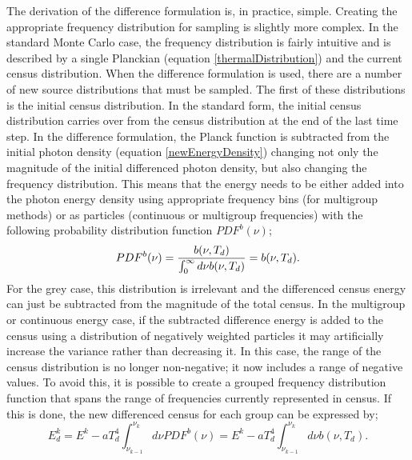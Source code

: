 \noindent
	\indent The derivation of the difference formulation is, in practice, simple. Creating the appropriate frequency distribution for sampling is slightly more complex. In the standard Monte Carlo case, the frequency distribution is fairly intuitive and is described by a single Planckian (equation \ref{thermalDistribution}) and the current census distribution. When the difference formulation is used, there are a number of new source distributions that must be sampled. The first of these distributions is the initial census distribution. In the standard form, the initial census distribution carries over from the census distribution at the end of the last time step. In the difference formulation, the Planck function is subtracted from the initial photon density (equation \ref{newEnergyDensity}) changing not only the magnitude of the initial differenced photon density, but also changing the frequency distribution. This means that the energy needs to be either added into the photon energy density using appropriate frequency bins (for multigroup methods) or as particles (continuous or multigroup frequencies) with the following probability distribution function $PDF^{b}(\nu)$;
	\begin{equation}
	\label{differencedCensusFP}
	PDF^{b}(\nu)={b(\nu,T_d)\over{\int^\infty_0d\nu{b(\nu,T_d)}}}={b(\nu,T_d)}.
	\end{equation}
	For the grey case, this distribution is irrelevant and the differenced census energy can just be subtracted from the magnitude of the total census. In the multigroup or continuous energy case, if the subtracted difference energy is added to the census using a distribution of negatively weighted particles it may artificially increase the variance rather than decreasing it. In this case, the range of the census distribution is no longer non-negative; it now includes a range of negative values. To avoid this, it is possible to create a grouped frequency distribution function that spans the range of frequencies currently represented in census. If this is done, the new differenced census for each group can be expressed by;
	\begin{equation}
	\label{E_d}
	E_d^k=E^k-aT_d^4\int^{\nu_k}_{\nu_{k-1}}d\nu{PDF^{b}(\nu)}=E^k-aT_d^4\int^{\nu_k}_{\nu_{k-1}}d\nu{b(\nu,T_d)}.
	\end{equation}

